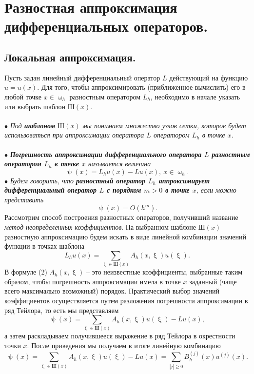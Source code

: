 \documentclass[a4paper, 12pt]{report}
\numberwithin{equation}{section}
\renewcommand{\geq}{\geqslant}
\renewcommand{\psi}{\uppsi}
\renewcommand{\omega}{\upomega}
\renewcommand{\xi}{\upxi}
\begin{document}
\section{Разностная аппроксимация дифференциальных операторов.}
\subsection{Локальная аппроксимация.}
Пусть задан линейный дифференциальный оператор $L$ действующий на функцию $u=u(x)$. Для того, чтобы аппроксимировать (приближенное вычислить) его в любой точке $x\in \omega _h$ разностным оператором $L_h$, необходимо в начале указать или выбрать шаблон $\text {Ш} (x)$. \\\\
$\bullet$ \textit{Под \textbf{шаблоном} $\text{Ш}(x)$ мы понимаем множество узлов сетки, которое будет использоваться при аппроксимации оператора $L$ оператором $L_h$ в точке $x$.}\\\\
$\bullet$ \textit{\textbf{Погрешность аппроксимации дифференциального оператора $L$ разностным оператором $L_h$ в точке $x$} называется величина }
\begin{equation}
\psi(x) = L_hu(x) - Lu(x),\ x\in \omega_h.
\end{equation}
$\bullet$ \textit{Будем говорить, что \textbf{разностный оператор $L_h$ аппроксимирует дифференциальный оператор $L$ с порядком $m>0$ в точке $x$}, если можно представить} $$\psi(x) = O(h^m).$$
Рассмотрим способ построения разностных операторов, получивший название \textit{метод неопределенных коэффициентов}. На выбранном шаблоне $\text{Ш}(x)$ разностную аппроксимацию будем искать в виде линейной комбинации значений функции в точках шаблона \begin{equation}
L_hu(x) = \sum_{\xi \in \text{Ш}(x)} A_h(x, \xi) u(\xi).
\end{equation}
В формуле (2) $A_h(x, \xi)$ -- это неизвестные коэффициенты, выбранные таким образом, чтобы погрешность аппроксимации имела в точке $x$ заданный (чаще всего максимально возможный) порядок. Практический выбор значений коэффициентов осуществляется путем разложения погрешности аппроксимации в ряд Тейлора, то есть мы представляем $$\psi(x) = \sum_{\xi \in \text{Ш}(x)} A_h(x, \xi) u(\xi) - Lu(x),$$
а затем раскладываем получившееся выражение в ряд Тейлора в окрестности точки $x$. После приведения мы получаем в итоге линейную комбинацию 
$$\psi(x) = \sum_{\xi \in \text{Ш}(x)} A_h(x, \xi) u(\xi) - Lu(x) = \sum_{|j|\geq 0} B_h^{(j)}(x) u^{(j)}(x).$$
\end{document}
